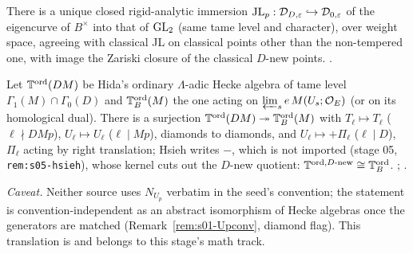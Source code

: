 \begin{theorem}\label{thm:s01-chenevier}
There is a unique closed rigid-analytic immersion $\mathrm{JL}_p:\mathcal D_{D,\varepsilon}\hookrightarrow\mathcal D_{0,\varepsilon}$ of the
eigencurve of $B^\times$ into that of $\mathrm{GL}_2$ (same tame level and character), over weight space, agreeing with classical JL on
classical points other than the non-tempered one, with image the Zariski closure of the classical $D$-new points.
\stcited{} .
\end{theorem}

\begin{theorem}\label{thm:s01-lambdaJL}
Let $\mathbb{T}^{\mathrm{ord}}(DM)$ be Hida's ordinary $\Lambda$-adic Hecke algebra of tame level $\Gamma_1(M)\cap\Gamma_0(D)$ and
$\mathbb{T}^{\mathrm{ord}}_B(M)$ the one acting on $\varprojlim_se\,M(U_s;\mathcal{O}_E)$ (or on its homological dual). There is a surjection
$\mathbb{T}^{\mathrm{ord}}(DM)\twoheadrightarrow\mathbb{T}^{\mathrm{ord}}_B(M)$ with $T_\ell\mapsto T_\ell$ ($\ell\nmid DMp$), $U_\ell\mapsto U_\ell$ ($\ell\mid Mp$),
diamonds to diamonds, and $U_\ell\mapsto+\Pi_\ell$ ($\ell\mid D$), $\Pi_\ell$ acting by right translation; Hsieh writes $-$, which is not imported (stage 05, \texttt{rem:s05-hsieh}),
whose kernel cuts out the
$D$-new quotient: $\mathbb{T}^{\mathrm{ord},D\text{-new}}\cong\mathbb{T}^{\mathrm{ord}}_B$.
\stcited{} ; .
\end{theorem}
\noindent\emph{Caveat.} Neither source uses $N_{U_p}$ verbatim in the seed's convention; the statement is
convention-independent as an abstract isomorphism of Hecke algebras once the generators are matched
(Remark~\ref{rem:s01-Upconv}, diamond flag). This translation is \sttoprove{} and belongs to this stage's math track.

